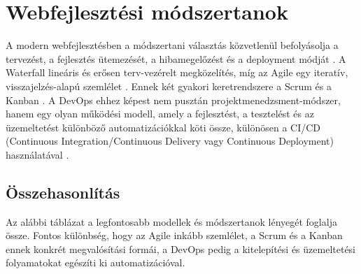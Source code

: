 \section{Webfejlesztési módszertanok}
A modern webfejlesztésben a módszertani választás közvetlenül befolyásolja a tervezést, a fejlesztés ütemezését, a hibamegelőzést és a deployment módját \cite{ibmSdlc,dora2018accelerate}. A Waterfall lineáris és erősen terv-vezérelt megközelítés, míg az Agile egy iteratív, visszajelzés-alapú szemlélet \cite{ibmAgileVsWaterfall,agileManifesto2001}. Ennek két gyakori keretrendszere a Scrum és a Kanban \cite{schwaberSutherland2020scrumGuide,kanbanGuides2025}. A DevOps ehhez képest nem pusztán projektmenedzsment-módszer, hanem egy olyan működési modell, amely a fejlesztést, a tesztelést és az üzemeltetést különböző automatizációkkal köti össze, különösen a CI/CD (Continuous Integration/Continuous Delivery vagy Continuous Deployment) használatával \cite{atlassianDevOps,awsCicd}.

\subsection{Összehasonlítás}
Az alábbi táblázat a legfontosabb modellek és módszertanok lényegét foglalja össze. Fontos különbség, hogy az Agile inkább szemlélet, a Scrum és a Kanban ennek konkrét megvalósítási formái, a DevOps pedig a kitelepítési és üzemeltetési folyamatokat egészíti ki automatizációval.

